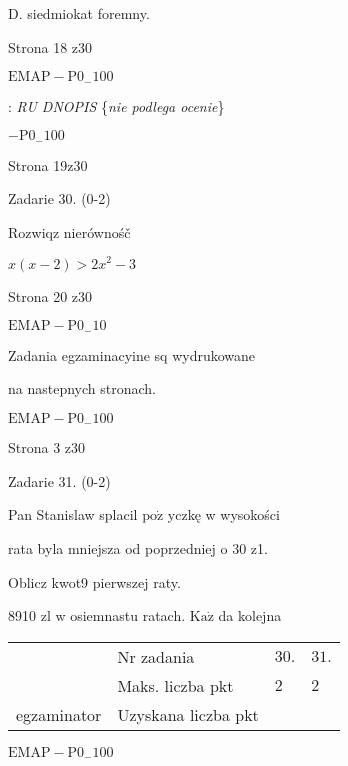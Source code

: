 \documentclass[a4paper,12pt]{article}
\begin{document}
D. siedmiokat foremny.

Strona 18 z30

$\mathrm{E}\mathrm{M}\mathrm{A}\mathrm{P}-\mathrm{P}0_{-}100$





: {\it RU DNOPIS} \{{\it nie podlega ocenie}\}

$-\mathrm{P}0_{-}100$

Strona 19z30





Zadarie 30. (0-2)

Rozwiqz nierównośč

$x(x-2)>2x^{2}-3$

Strona 20 z30

$\mathrm{E}\mathrm{M}\mathrm{A}\mathrm{P}-\mathrm{P}0_{-}10$





Zadania egzaminacyine sq wydrukowane

na nastepnych stronach.

$\mathrm{E}\mathrm{M}\mathrm{A}\mathrm{P}-\mathrm{P}0_{-}100$

Strona 3 z30





Zadarie 31. (0-2)

Pan Stanislaw splacil $\mathrm{p}\mathrm{o}\dot{\mathrm{z}}$ yczkę w wysokości

rata byla mniejsza od poprzedniej o 30 z1.

Oblicz kwot9 pierwszej raty.

8910 zl w osiemnastu ratach. $\mathrm{K}\mathrm{a}\dot{\mathrm{z}}$ da kolejna
\begin{center}
\begin{tabular}{|l|l|l|l|}
\cline{2-4}
&	\multicolumn{1}{|l|}{Nr zadania}&	\multicolumn{1}{|l|}{$30.$}&	\multicolumn{1}{|l|}{ $31.$}	\\
\cline{2-4}
&	\multicolumn{1}{|l|}{Maks. liczba pkt}&	\multicolumn{1}{|l|}{$2$}&	\multicolumn{1}{|l|}{ $2$}	\\
\cline{2-4}
\multicolumn{1}{|l|}{egzaminator}&	\multicolumn{1}{|l|}{Uzyskana liczba pkt}&	\multicolumn{1}{|l|}{}&	\multicolumn{1}{|l|}{}	\\
\hline
\end{tabular}

\end{center}
$\mathrm{E}\mathrm{M}\mathrm{A}\mathrm{P}-\mathrm{P}0_{-}100$
\end{document}
